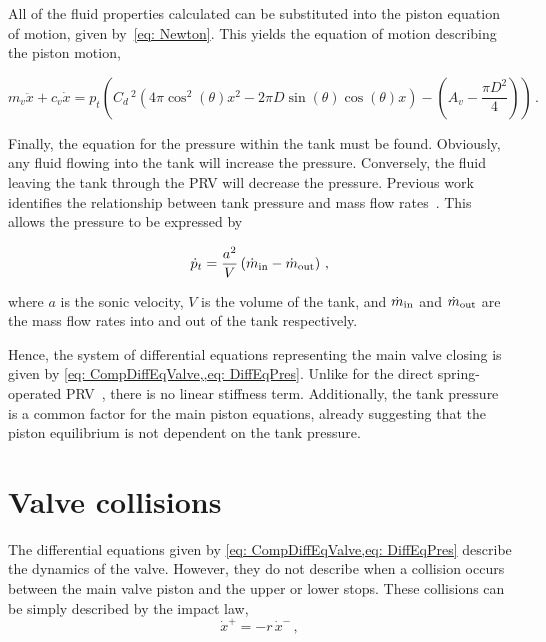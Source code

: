 All of the fluid properties calculated can be substituted into the piston equation of motion, given by~\cref{eq: Newton}. This yields the equation of motion describing the piston motion,

\begin{equation} \label{eq: CompDiffEqValve}
    m_v \ddot{x} + c_v \dot{x} = p_t \left(
    C_d \,^2 \left( 4 \pi \cos^2(\theta) x^2
    - 2 \pi D \sin(\theta) \cos(\theta) x \right)
    - \left( A_v - \frac{\pi D^2}{4} \right)
    \right) \, .
\end{equation}

Finally, the equation for the pressure within the tank must be found. Obviously, any fluid flowing into the tank will increase the pressure. Conversely, the fluid leaving the tank through the PRV will decrease the pressure. Previous work identifies the relationship between tank pressure and mass flow rates~\cite{Hos2015DynamicModelling}. This allows the pressure to be expressed by

\begin{equation} \label{eq: DiffEqPres}
    \dot{p}_t = \frac{a^2}{V} \left( \dot{m}_{\rm{in}} - \dot{m}_{\rm{out}} \right) \, ,
\end{equation}

where $a$ is the sonic velocity, $V$ is the volume of the tank, and $\dot{m}_{\rm{in}}$ and $\dot{m}_{\rm{out}}$ are the mass flow rates into and out of the tank respectively.

Hence, the system of differential equations representing the main valve closing is given by \cref{eq: CompDiffEqValve,,eq: DiffEqPres}. Unlike for the direct spring-operated PRV~\cite{Hos2014DynamicMechanisms}, there is no linear stiffness term. Additionally, the tank pressure is a common factor for the main piston equations, already suggesting that the piston equilibrium is not dependent on the tank pressure. %

\newpage
\section{Valve collisions} \label{sec: ValveCollision}

The differential equations given by \cref{eq: CompDiffEqValve,eq: DiffEqPres} describe the dynamics of the valve. However, they do not describe when a collision occurs between the main valve piston and the upper or lower stops. These collisions can be simply described by the impact law,
~
\begin{equation} \label{eq: ImpactLaw}
    \dot{x}^+ = - r \, \dot{x}^- \, ,
\end{equation}

